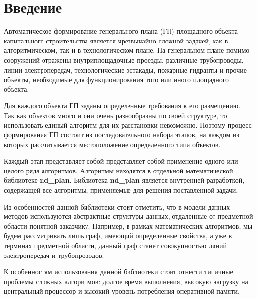 \section*{\Large{Введение}}
Автоматическое формирование генерального плана (ГП) площадного объекта капитального строительства является чрезвычайно
сложной задачей, как в алгоритмическом, так и в технологическом плане.
На генеральном плане помимо сооружений отражены внутриплощадочные проезды, различные трубопроводы, линии электропередач,
технологические эстакады, пожарные гидранты и прочие объекты,
необходимые для функционирования того или иного площадного объекта.

Для каждого объекта ГП заданы определенные требования к его размещению.
Так как объектов много и они очень разнообразны по своей структуре,
то использовать единый алгоритм для их расстановки невозможно.
Поэтому процесс формирования ГП состоит из последовательного набора этапов, на каждом из которых
рассчитывается местоположение определенного типа объектов.

Каждый этап представляет собой представляет собой применение одного или целого ряда алгоритмов.
Алгоритмы находятся в отдельной математической библиотеке \textbf{nd\_plan}.
Библиотека \textbf{nd\_plan} является внутренней разработкой, содержащей все алгоритмы,
применяемые для решения поставленной задачи.

Из особенностей данной библиотеки стоит отметить, что в модели данных методов используются абстрактные
структуры данных, отдаленные от предметной области понятной заказчику. Например, в рамках
математических алгоритмов, мы будем рассматривать лишь граф, имеющий определенные свойства,
а уже в терминах предметной области, данный граф станет совокупностью линий электропередач и трубопроводов.

К особенностям использования данной библиотеки стоит отнести типичные проблемы сложных алгоритмов: долгое время
выполнения, высокую нагрузку на центральный процессор и высокий уровень потребления оперативной памяти.
